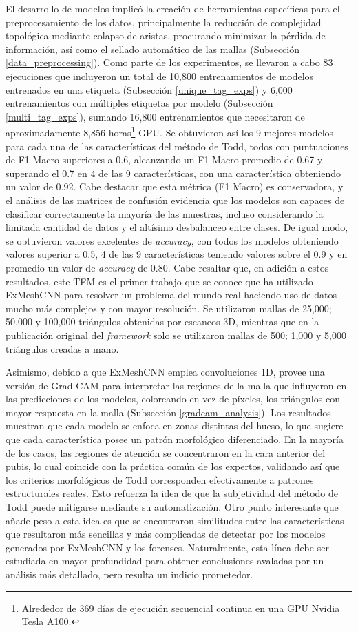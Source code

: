 El desarrollo de modelos implicó la creación de herramientas específicas para el preprocesamiento de los datos, principalmente la reducción de complejidad topológica mediante colapso de aristas, procurando minimizar la pérdida de información, así como el sellado automático de las mallas (Subsección \ref{data_preprocessing}). Como parte de los experimentos, se llevaron a cabo 83 ejecuciones que incluyeron un total de 10,800 entrenamientos de modelos entrenados en una etiqueta (Subsección \ref{unique_tag_exps}) y 6,000 entrenamientos con múltiples etiquetas por modelo (Subsección \ref{multi_tag_exps}), sumando 16,800 entrenamientos que necesitaron de aproximadamente 8,856 horas\footnote{Alrededor de 369 días de ejecución secuencial continua en una GPU Nvidia Tesla A100.} GPU\cite{englewood_understanding_2025}. Se obtuvieron así los 9 mejores modelos para cada una de las características del método de Todd, todos con puntuaciones de F1 Macro superiores a 0.6, alcanzando un F1 Macro promedio de 0.67 y superando el 0.7 en 4 de las 9 características, con una característica obteniendo un valor de 0.92. Cabe destacar que esta métrica (F1 Macro) es conservadora, y el análisis de las matrices de confusión evidencia que los modelos son capaces de clasificar correctamente la mayoría de las muestras, incluso considerando la limitada cantidad de datos y el altísimo desbalanceo entre clases. De igual modo, se obtuvieron valores excelentes de \textit{accuracy}, con todos los modelos obteniendo valores superior a 0.5, 4 de las 9 características teniendo valores sobre el 0.9 y en promedio un valor de \textit{accuracy} de 0.80. Cabe resaltar que, en adición a estos resultados, este TFM es el primer trabajo que se conoce que ha utilizado ExMeshCNN para resolver un problema del mundo real haciendo uso de datos mucho más complejos y con mayor resolución. Se utilizaron mallas de 25,000; 50,000 y 100,000 triángulos obtenidas por escaneos 3D, mientras que en la publicación original del \textit{framework} solo se utilizaron mallas de 500; 1,000 y 5,000 triángulos creadas a mano.

Asimismo, debido a que ExMeshCNN emplea convoluciones 1D, provee una versión de Grad-CAM para interpretar las regiones de la malla que influyeron en las predicciones de los modelos, coloreando en vez de píxeles, los triángulos con mayor respuesta en la malla (Subsección \ref{gradcam_analysis}). Los resultados muestran que cada modelo se enfoca en zonas distintas del hueso, lo que sugiere que cada característica posee un patrón morfológico diferenciado. En la mayoría de los casos, las regiones de atención se concentraron en la cara anterior del pubis, lo cual coincide con la práctica común de los expertos, validando así que los criterios morfológicos de Todd corresponden efectivamente a patrones estructurales reales. Esto refuerza la idea de que la subjetividad del método de Todd puede mitigarse mediante su automatización. Otro punto interesante que añade peso a esta idea es que se encontraron similitudes entre las características que resultaron más sencillas y más complicadas de detectar por los modelos generados por ExMeshCNN y los forenses. Naturalmente, esta línea debe ser estudiada en mayor profundidad para obtener conclusiones avaladas por un análisis más detallado, pero resulta un indicio prometedor.

